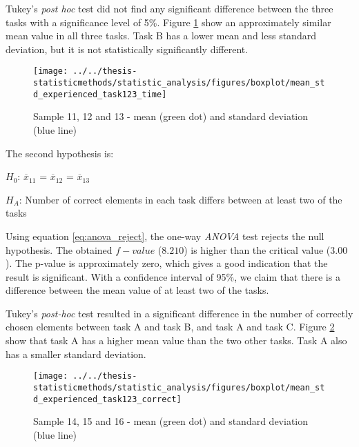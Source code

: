  Tukey's \textit{post hoc} test did not find any significant difference between the three tasks with a significance level of 5\%. Figure \ref{fig:meanstdexperiencedtask123time} show an approximately similar mean value in all three tasks. Task B has a lower mean and less standard deviation, but it is not statistically significantly different.

\begin{figure}[H]
	\centering
	\texttt{[image: ../../thesis-statisticmethods/statistic\_analysis/figures/boxplot/mean\_std\_experienced\_task123\_time]}
	\caption{Sample 11, 12 and 13 - mean (green dot) and standard deviation (blue line)}
	\label{fig:meanstdexperiencedtask123time}
\end{figure}


The second hypothesis is:\\
\centerline{$H_{0}$: $\overline{x}_{11}$ = $\overline{x}_{12}$ = $\overline{x}_{13}$}
\centerline{$H_{A}$: Number of correct elements in each task differs between at least two of the tasks}
\vspace{0.2cm}

Using equation \ref{eq:anova_reject}, the one-way \textit{ANOVA} test rejects the null hypothesis. The obtained $f-value$ ($8.210$) is higher than the critical value ($3.00$). The p-value is approximately zero, which gives a good indication that the result is significant. With a confidence interval of 95\%, we claim that there is a difference between the mean value of at least two of the tasks. 

Tukey's \textit{post-hoc} test resulted in a significant difference in the number of correctly chosen elements between task A and task B, and task A and task C. Figure \ref{fig:meanstdexperiencedtask123correct} show that task A has a higher mean value than the two other tasks. Task A also has a smaller standard deviation. 

\begin{figure}[H]
	\centering
	\texttt{[image: ../../thesis-statisticmethods/statistic\_analysis/figures/boxplot/mean\_std\_experienced\_task123\_correct]}
	\caption{Sample 14, 15 and 16 - mean (green dot) and standard deviation (blue line)}
	\label{fig:meanstdexperiencedtask123correct}
\end{figure}

